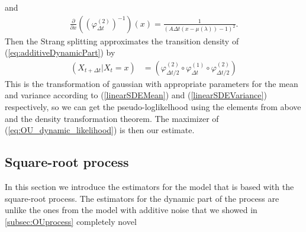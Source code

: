 and 
\begin{align}
    \frac{\partial}{\partial x} \left(\left(\varphi^{(2)}_{\Delta t}\right)^{-1}\right)(x) = \frac{1}{\left(A \Delta t\left(x-\mu\left(\lambda \right)\right) - 1\right)^2}.
\end{align}
Then the Strang splitting approximates the transition density of (\ref{eq:additiveDynamicPart}) by
\begin{align}
    \left(X_{t + \Delta t} | X_t = x\right) &= \left(\varphi^{(2)}_{\Delta t / 2}\circ \varphi^{(1)}_{\Delta t} \circ \varphi^{(2)}_{\Delta t / 2}\right) \label{eq:OU_dynamic_likelihood}
\end{align}
This is the transformation of gaussian with appropriate parameters for the mean and variance according to (\ref{linearSDEMean}) and (\ref{linearSDEVariance}) respectively, so we can get the pseudo-loglikelhood using the elements from above and the density transformation theorem. The maximizer of (\ref{eq:OU_dynamic_likelihood}) is then our estimate. 
\subsection{Square-root process}\label{subsec:squareroot}
In this section we introduce the estimators for the model that is based with the square-root process. The estimators for the dynamic part of the process are unlike the ones from the model with additive noise that we showed in \ref{subsec:OUprocess} completely novel
